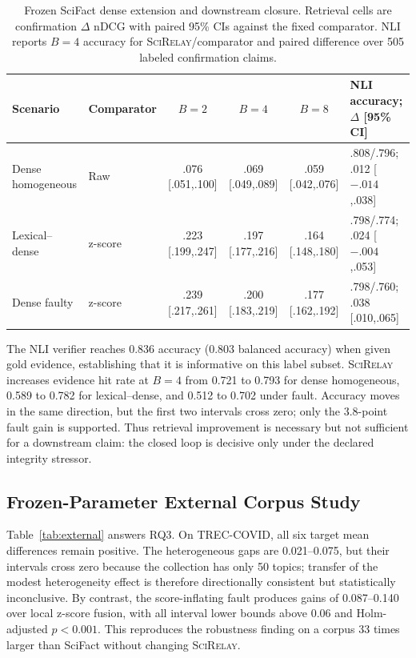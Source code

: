 \documentclass[sigconf]{acmart}
\newcommand{\method}{\textsc{SciRelay}}
\begin{document}
\begin{table}[t]
\caption{Frozen SciFact dense extension and downstream closure. Retrieval cells are confirmation $\Delta$ nDCG with paired 95\% CIs against the fixed comparator. NLI reports $B=4$ accuracy for \method{}/comparator and paired difference over 505 labeled confirmation claims.}
\label{tab:dense-downstream}
\centering
\scriptsize
\setlength{\tabcolsep}{4.0pt}
\begin{tabular}{llcccl}
\toprule
Scenario & Comparator & $B=2$ & $B=4$ & $B=8$ & NLI accuracy; $\Delta$ [95\% CI] \\
\midrule
Dense homogeneous & Raw & .076 [.051,.100] & .069 [.049,.089] & .059 [.042,.076] & .808/.796; .012 [$-.014$,.038] \\
Lexical--dense & z-score & .223 [.199,.247] & .197 [.177,.216] & .164 [.148,.180] & .798/.774; .024 [$-.004$,.053] \\
Dense faulty & z-score & .239 [.217,.261] & .200 [.183,.219] & .177 [.162,.192] & .798/.760; .038 [.010,.065] \\
\bottomrule
\end{tabular}
\end{table}

The NLI verifier reaches 0.836 accuracy (0.803 balanced accuracy) when given gold evidence, establishing that it is informative on this label subset. \method{} increases evidence hit rate at $B=4$ from 0.721 to 0.793 for dense homogeneous, 0.589 to 0.782 for lexical--dense, and 0.512 to 0.702 under fault. Accuracy moves in the same direction, but the first two intervals cross zero; only the 3.8-point fault gain is supported. Thus retrieval improvement is necessary but not sufficient for a downstream claim: the closed loop is decisive only under the declared integrity stressor.

\subsection{Frozen-Parameter External Corpus Study}

Table~\ref{tab:external} answers RQ3. On TREC-COVID, all six target mean differences remain positive. The heterogeneous gaps are 0.021--0.075, but their intervals cross zero because the collection has only 50 topics; transfer of the modest heterogeneity effect is therefore directionally consistent but statistically inconclusive. By contrast, the score-inflating fault produces gains of 0.087--0.140 over local z-score fusion, with all interval lower bounds above 0.06 and Holm-adjusted $p<0.001$. This reproduces the robustness finding on a corpus 33 times larger than SciFact without changing \method{}.
\end{document}
